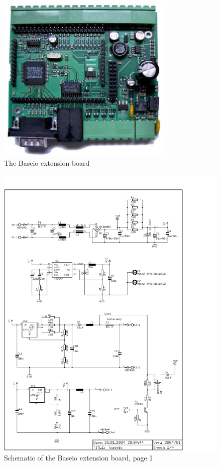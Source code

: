 \begin{figure}[h]
    \centering
    \includegraphics[height=80mm]{appendix/baseio_large}
    \caption{The Baseio extension board}
\end{figure}
\begin{figure}
    \centering
    \includegraphics[scale=0.68]{appendix/baseio_p1}
    \caption{Schematic of the Baseio extension board, page 1}
\end{figure}
